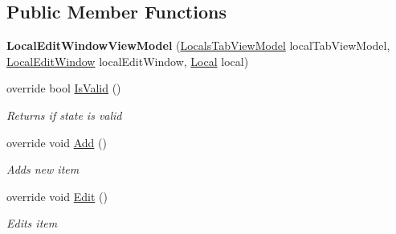 \subsection*{Public Member Functions}
\begin{DoxyCompactItemize}
\item 
\hypertarget{class_baudi_1_1_client_1_1_view_models_1_1_edit_window_view_models_1_1_local_edit_window_view_model_a8784b61bffd4feb6c4b67f2a0c8b8fb2}{}{\bfseries Local\+Edit\+Window\+View\+Model} (\hyperlink{class_baudi_1_1_client_1_1_view_models_1_1_tabs_view_models_1_1_locals_tab_view_model}{Locals\+Tab\+View\+Model} local\+Tab\+View\+Model, \hyperlink{class_baudi_1_1_client_1_1_view_1_1_edit_windows_1_1_local_edit_window}{Local\+Edit\+Window} local\+Edit\+Window, \hyperlink{class_baudi_1_1_d_a_l_1_1_models_1_1_local}{Local} local)\label{class_baudi_1_1_client_1_1_view_models_1_1_edit_window_view_models_1_1_local_edit_window_view_model_a8784b61bffd4feb6c4b67f2a0c8b8fb2}

\item 
override bool \hyperlink{class_baudi_1_1_client_1_1_view_models_1_1_edit_window_view_models_1_1_local_edit_window_view_model_ae6497c5d489583fe94c6d18ccb80510d}{Is\+Valid} ()
\begin{DoxyCompactList}\small\item\em Returns if state is valid \end{DoxyCompactList}\item 
override void \hyperlink{class_baudi_1_1_client_1_1_view_models_1_1_edit_window_view_models_1_1_local_edit_window_view_model_a3cfae54d44ef6a383301c3b9f737f3f4}{Add} ()
\begin{DoxyCompactList}\small\item\em Adds new item \end{DoxyCompactList}\item 
override void \hyperlink{class_baudi_1_1_client_1_1_view_models_1_1_edit_window_view_models_1_1_local_edit_window_view_model_a001b42b1f322fa523666d5a7b5ac4dcc}{Edit} ()
\begin{DoxyCompactList}\small\item\em Edits item \end{DoxyCompactList}\end{DoxyCompactItemize}
